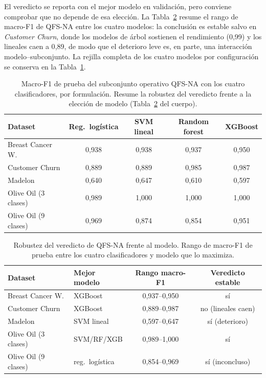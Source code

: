 El veredicto se reporta con el mejor modelo en validación, pero conviene
comprobar que no depende de esa elección. La Tabla~\ref{tab:qfs-robustez}
resume el rango de macro-F1 de QFS-NA entre los cuatro modelos: la
conclusión es estable salvo en \textit{Customer Churn}, donde los modelos
de árbol sostienen el rendimiento (0{,}99) y los lineales caen a 0{,}89, de
modo que el deterioro leve es, en parte, una interacción
modelo--subconjunto. La rejilla completa de los cuatro modelos por
configuración se conserva en la Tabla~\ref{tab:ap-qfs-modelos}.

\begin{table}[!htbp]
  \centering
  \caption[Rendimiento de QFS-NA por modelo]{Macro-F1 de prueba del
    subconjunto operativo QFS-NA con los cuatro clasificadores, por
    formulación. Resume la robustez del veredicto frente a la elección de
    modelo (Tabla~\ref{tab:qfs-robustez} del cuerpo).}
  \label{tab:ap-qfs-modelos}
  \small
  \begin{tabular}{lcccc}
    \toprule
    Dataset & Reg.\ logística & SVM lineal & Random forest & XGBoost \\
    \midrule
    Breast Cancer W. & 0{,}938 & 0{,}938 & 0{,}937 & 0{,}950 \\
    Customer Churn & 0{,}889 & 0{,}889 & 0{,}985 & 0{,}987 \\
    Madelon & 0{,}640 & 0{,}647 & 0{,}610 & 0{,}597 \\
    Olive Oil (3 clases) & 0{,}989 & 1{,}000 & 1{,}000 & 1{,}000 \\
    Olive Oil (9 clases) & 0{,}969 & 0{,}874 & 0{,}854 & 0{,}951 \\
    \bottomrule
  \end{tabular}
\end{table}
\FloatBarrier

\begin{table}[!htbp]
  \centering
  \caption[Robustez del veredicto de QFS-NA entre modelos]{Robustez del
    veredicto de QFS-NA frente al modelo. Rango de macro-F1 de prueba
    entre los cuatro clasificadores y modelo que lo maximiza.}
  \label{tab:qfs-robustez}
  \small
  \begin{tabular}{llcc}
    \toprule
    Dataset & Mejor modelo & Rango macro-F1 & Veredicto estable \\
    \midrule
    Breast Cancer W. & XGBoost & 0{,}937--0{,}950 & sí \\
    Customer Churn & XGBoost & 0{,}889--0{,}987 & no (lineales caen) \\
    Madelon & SVM lineal & 0{,}597--0{,}647 & sí (deterioro) \\
    Olive Oil (3 clases) & SVM/RF/XGB & 0{,}989--1{,}000 & sí \\
    Olive Oil (9 clases) & reg.\ logística & 0{,}854--0{,}969 & sí (inconcluso) \\
    \bottomrule
  \end{tabular}
\end{table}
\FloatBarrier

